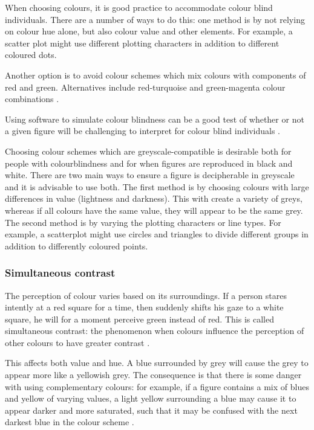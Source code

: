 \documentclass[letterpaper]{report}\usepackage[]{graphicx}\usepackage[]{color}
\begin{document}
When choosing colours, it is good practice to accommodate colour blind individuals. There are a number of ways to do this: one method is by not relying on colour hue alone, but also colour value and other elements. For example, a scatter plot might use different plotting characters in addition to different coloured dots. 

Another option is to avoid colour schemes which mix colours with components of red and green. Alternatives include red-turquoise and green-magenta colour combinations \cite{wong4}.

Using software to simulate colour blindness can be a good test of whether or not a given figure will be challenging to interpret for colour blind individuals \cite{wong4}.

Choosing colour schemes which are greyscale-compatible is desirable both for people with colourblindness and for when figures are reproduced in black and white. There are two main ways to ensure a figure is decipherable in greyscale and it is advisable to use both. The first method is by choosing colours with large differences in value (lightness and darkness). This with create a variety of greys, whereas if all colours have the same value, they will appear to be the same grey. The second method is by varying the plotting characters or line types. For example, a scatterplot might use circles and triangles to divide different groups in addition to differently coloured points. 

\subsubsection{Simultaneous contrast}
The perception of colour varies based on its surroundings. If a person stares intently at a red square for a time, then suddenly shifts his gaze to a white square, he will for a moment perceive green instead of red. This is called simultaneous contrast: the phenomenon when colours influence the perception of other colours to have greater contrast \cite{albers}. 

This affects both value and hue. A blue surrounded by grey will cause the grey to appear more like a yellowish grey. The consequence is that there is some danger with using complementary colours: for example, if a figure contains a mix of blues and yellow of varying values, a light yellow surrounding a blue may cause it to appear darker and more saturated, such that it may be confused with the next darkest blue in the colour scheme \cite{brewers-sim}. 
\end{document}
